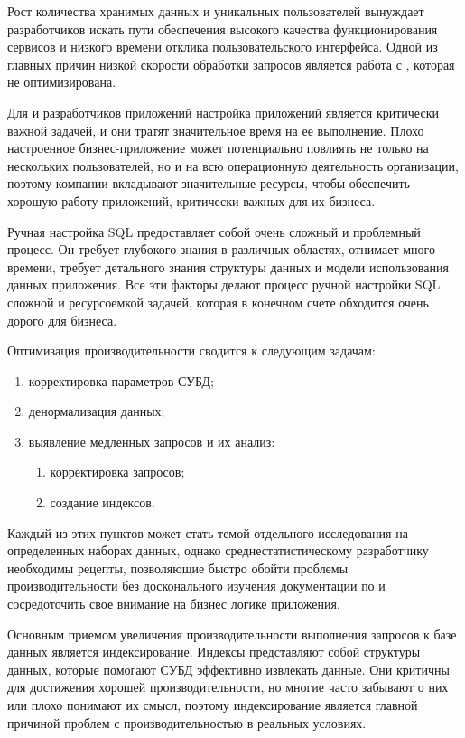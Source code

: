 \Introduction

Рост количества хранимых данных и уникальных пользователей вынуждает разработчиков искать пути обеспечения высокого качества функционирования сервисов и низкого времени отклика пользовательского интерфейса. Одной из главных причин низкой скорости обработки запросов является работа с , которая не оптимизирована.  \cite{article:tsiganov}

Для  и разработчиков приложений настройка приложений является критически важной задачей, и они тратят значительное время на ее выполнение. Плохо настроенное бизнес-приложение может потенциально повлиять не только на нескольких пользователей, но и на всю операционную деятельность организации, поэтому компании вкладывают значительные ресурсы, чтобы обеспечить хорошую работу приложений, критически важных для их бизнеса.\cite{fors.ru:Oracle-Database}

Ручная настройка SQL предоставляет собой очень сложный и проблемный процесс. Он требует глубокого знания в различных областях, отнимает много времени, требует детального знания структуры данных и модели использования данных приложения. Все эти факторы делают процесс ручной настройки SQL сложной и ресурсоемкой задачей, которая в конечном счете обходится очень дорого для бизнеса. \cite{fors.ru:Oracle-Database}

Оптимизация производительности сводится к следующим задачам: 
\begin{enumerate}
\item корректировка параметров СУБД;
\item денормализация данных;
\item выявление медленных запросов и их анализ:
    \begin{enumerate}
    \item корректировка запросов;
    \item создание индексов.
    \end{enumerate}
\end{enumerate}

Каждый из этих пунктов может стать темой отдельного исследования на определенных наборах данных, однако среднестатистическому разработчику необходимы рецепты, позволяющие быстро обойти проблемы производительности без досконального изучения документации по  и сосредоточить свое внимание на бизнес логике приложения. \cite{article:tsiganov}

Основным приемом увеличения производительности выполнения запросов к базе данных является индексирование. Индексы представляют собой структуры данных, которые помогают СУБД эффективно извлекать данные. Они критичны для достижения хорошей производительности, но многие часто забывают о них или плохо понимают их смысл, поэтому индексирование является главной причиной проблем с производительностью в реальных условиях. \cite{zaitsev}

